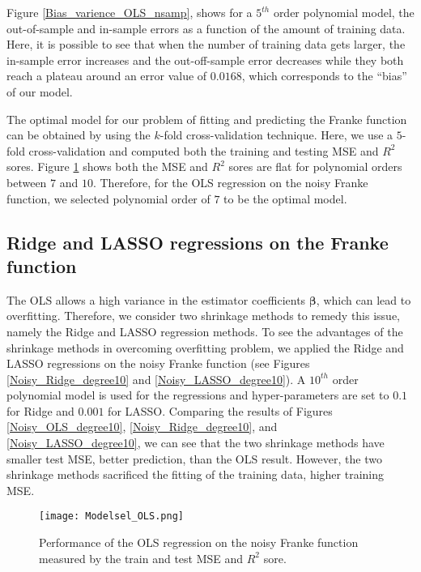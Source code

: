 \documentclass[a4paper]{article}
\begin{document}
Figure \ref{Bias_varience_OLS_nsamp}, shows for a $5^{th}$ order polynomial model, the out-of-sample and in-sample errors as a function of the amount of training data. Here, it is possible to see that when the number of training data gets larger, the in-sample error increases and the out-off-sample error decreases while they both reach a plateau around an error value of $0.0168$, which corresponds to the “bias” of our model.

The optimal model for our problem of fitting and predicting the Franke function can be obtained by using the $k$-fold cross-validation technique. Here, we use a $5$-fold cross-validation and computed both the training and testing MSE and $R^2$ sores. Figure \ref{Modelsel_OLS} shows both the MSE and $R^2$ sores are flat for polynomial orders between $7$ and $10$. Therefore, for the OLS regression on the noisy Franke function, we selected polynomial order of $7$ to be the optimal model.

\subsection{Ridge and LASSO regressions on the Franke function}
The OLS allows a high variance in the estimator coefficients $\mathbf{\beta}$, which can lead to overfitting. Therefore, we consider two shrinkage methods to remedy this issue, namely the Ridge and LASSO regression methods. To see the advantages of the shrinkage methods in overcoming overfitting problem, we applied the Ridge and LASSO regressions on the noisy Franke function (see Figures \ref{Noisy_Ridge_degree10} and \ref{Noisy_LASSO_degree10}). A $10^{th}$ order polynomial model is used for the regressions and hyper-parameters are set to $0.1$ for Ridge and $0.001$ for LASSO. Comparing the results of Figures \ref{Noisy_OLS_degree10}, \ref{Noisy_Ridge_degree10}, and \ref{Noisy_LASSO_degree10}, we can see that the two shrinkage methods have smaller test MSE, better prediction, than the OLS result. However, the two shrinkage methods sacrificed the fitting of the training data, higher training MSE. 

\begin{figure}[H]
  \centering
  \texttt{[image: Modelsel\_OLS.png]}
  \caption{Performance of the OLS regression on the noisy Franke function measured by the train and test MSE and $R^2$ sore.}
    \label{Modelsel_OLS}
\end{figure}
\end{document}

